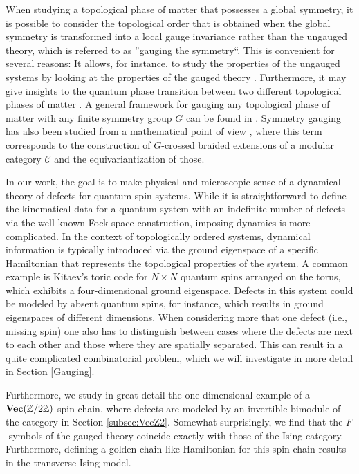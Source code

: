 When studying a topological phase of matter that possesses a global symmetry, it is possible to consider the topological order that is obtained when the global symmetry is transformed into a local gauge invariance rather than the ungauged theory, which is referred to as ''gauging the symmetry``. This is convenient for several reasons: It allows, for instance, to study the properties of the ungauged systems by looking at the properties of the gauged theory \cite{LG12,HW12,Swingle2014,CG14}. Furthermore, it may give insights to the quantum phase transition between two different topological phases of matter \cite{BS09,BW10,BW11,BSS12}. A general framework for gauging any topological phase of matter with any finite symmetry group $G$ can be found in \cite{BBCW14}. Symmetry gauging has also been studied from a mathematical point of view \cite{T00,ENO10,Turaev2010,CGPW16,EMJP18,CSZW18,D19,BJ19}, where this term corresponds to the construction of $G$-crossed braided extensions of a modular category $\mathcal{C}$ and the equivariantization of those.

In our work, the goal is to make physical and microscopic sense of a dynamical theory of defects for quantum spin systems. While it is straightforward to define the kinematical data for a quantum system with an indefinite number of defects via the well-known Fock space construction, imposing dynamics is more complicated. In the context of topologically ordered systems, dynamical information is typically introduced via the ground eigenspace of a specific Hamiltonian that represents the topological properties of the system. A common example is Kitaev's toric code for $N\times N$ quantum spins arranged on the torus, which exhibits a four-dimensional ground eigenspace. Defects in this system could be modeled by absent quantum spins, for instance, which results in ground eigenspaces of different dimensions. When considering more that one defect (i.e., missing spin) one also has to distinguish between cases where the defects are next to each other and those where they are spatially separated. This can result in a quite complicated combinatorial problem, which we will investigate in more detail in Section \ref{Gauging}.

Furthermore, we study in great detail the one-dimensional example of a $\textbf{Vec}(\mathbb{Z}/2\mathbb{Z})$ spin chain, where defects are modeled by an invertible bimodule of the category in Section \ref{subsec:VecZ2}. Somewhat surprisingly, we find that the $F$-symbols of the gauged theory coincide exactly with those of the Ising category. Furthermore, defining a golden chain like Hamiltonian for this spin chain results in the transverse Ising model.